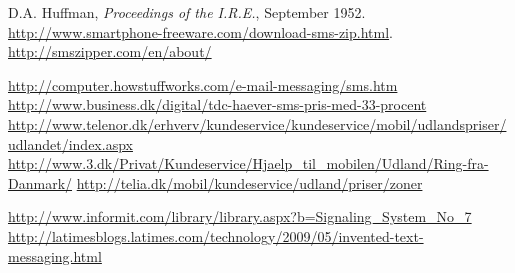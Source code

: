  D.A. Huffman, {\it Proceedings of the I.R.E.}, September 1952.
 {\url{http://www.smartphone-freeware.com/download-sms-zip.html}}.
 {\url{http://smszipper.com/en/about/}}

 {\url{http://computer.howstuffworks.com/e-mail-messaging/sms.htm}}
 {\url{http://www.business.dk/digital/tdc-haever-sms-pris-med-33-procent}}
 {\url{http://www.telenor.dk/erhverv/kundeservice/kundeservice/mobil/udlandspriser/udlandet/index.aspx}}
 {\url{http://www.3.dk/Privat/Kundeservice/Hjaelp_til_mobilen/Udland/Ring-fra-Danmark/}}
 {\url{http://telia.dk/mobil/kundeservice/udland/priser/zoner}}

 {\url{http://www.informit.com/library/library.aspx?b=Signaling_System_No_7}}
 {\url{http://latimesblogs.latimes.com/technology/2009/05/invented-text-messaging.html}}


